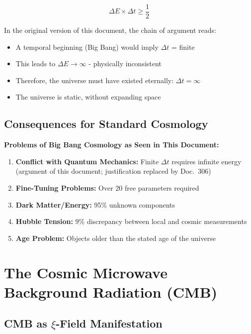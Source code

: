 	\begin{equation}
		\Delta E \times \Delta t \geq \frac{1}{2}
	\end{equation}
	
	In the original version of this document, the chain of argument reads:
	
	\begin{itemize}
		\item A temporal beginning (Big Bang) would imply $\Delta t$ = finite
		\item This leads to $\Delta E \to \infty$ - physically inconsistent
		\item Therefore, the universe must have existed eternally: $\Delta t = \infty$
		\item The universe is static, without expanding space
	\end{itemize}
	
	\subsection{Consequences for Standard Cosmology}
	
	\begin{warning}
		\textbf{Problems of Big Bang Cosmology as Seen in This Document:}
		
		\begin{enumerate}
			\item \textbf{Conflict with Quantum Mechanics:} Finite $\Delta t$ requires infinite energy (argument of this document; justification replaced by Doc.~306)
			\item \textbf{Fine-Tuning Problems:} Over 20 free parameters required
			\item \textbf{Dark Matter/Energy:} 95\% unknown components
			\item \textbf{Hubble Tension:} 9\% discrepancy between local and cosmic measurements
			\item \textbf{Age Problem:} Objects older than the stated age of the universe
		\end{enumerate}
	\end{warning}
	
	\section{The Cosmic Microwave Background Radiation (CMB)}
	
	\subsection{CMB as $\xi$-Field Manifestation}
	
